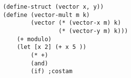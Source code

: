 \documentclass{article}
\begin{document}
\ttfamily

\begin{lstlisting}[language=najlepszy]
(define-struct (vector x, y))
(define (vector-mult m k) 
        (vector (* (vector-x m) k) 
                (* (vector-y m) k)))
    (+ modulo)
    (let [x 2] (+ x 5 ))
        (* +)
        (and)
        (if) ;costam
\end{lstlisting}
\end{document}
